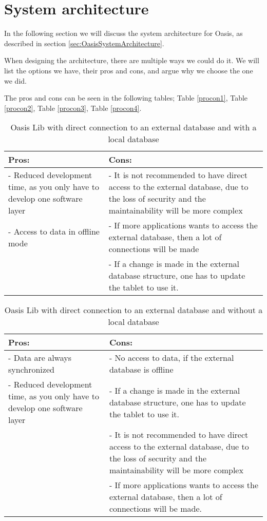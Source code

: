 \section{System architecture}
In the following section we will discuss the system architecture for Oasis, as described in section \vref{sec:OasisSystemArchitecture}.

When designing the architecture, there are multiple ways we could do it. We will list the options we have, their pros and cons, and argue why we choose the one we did.

The pros and cons can be seen in the following tables; Table \vref{procon1}, Table \vref{procon2}, Table \vref{procon3}, Table \vref{procon4}.

\begin{table}[htbp]
	\centering
		\begin{tabular}{| p{6cm} | m{6cm} |}
			\hline
			\textbf{Pros:} & \textbf{Cons:} \\ \hline
			- Reduced development time, as you only have to develop one software layer & - It is not recommended to have direct access to the external database, due to the loss of security and the maintainability will be more complex \\ \hline
			- Access to data in offline mode & - If more applications wants to access the external database, then a lot of connections will be made\\ \hline
			& - If a change is made in the external database structure, one has to update the tablet to use it. \\ \hline
		\end{tabular}
	\caption{Oasis Lib with direct connection to an external database and with a local database}
	\label{tab:procon1}
\end{table}

\begin{table}[htbp]
	\centering
		\begin{tabular}{| p{6cm} | m{6cm} |}
			\hline
			Pros: & Cons: \\ \hline
			- Data are always synchronized & - No access to data, if the external database is offline \\ \hline
			- Reduced development time, as you only have to develop one software layer & - If a change is made in the external database structure, one has to update the tablet to use it. \\ \hline
			& - It is not recommended to have direct access to the external database, due to the loss of security and the maintainability will be more complex \\ \hline
			& - If more applications wants to access the external database, then a lot of connections will be made. \\ \hline
		\end{tabular}
	\caption{Oasis Lib with direct connection to an external database and without a local database}
	\label{tab:procon2}
\end{table}
	
